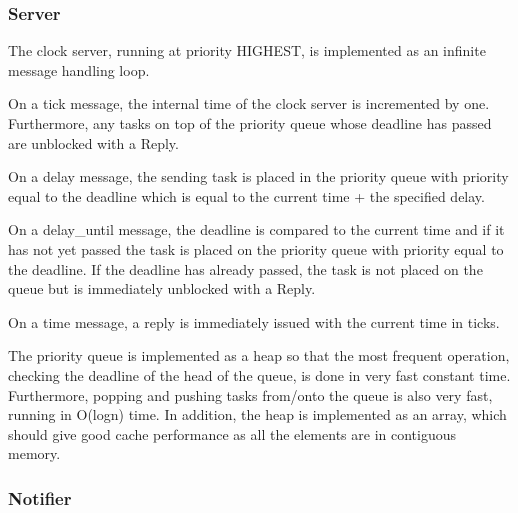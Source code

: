 \documentclass{article}
\begin{document}
\subsubsection{Server}
The clock server, running at priority HIGHEST, is implemented as an infinite message handling loop. 

On a tick message, the internal time of the clock server is incremented by one. Furthermore, any tasks on top of the priority queue whose deadline has passed are unblocked with a Reply.

On a delay message, the sending task is placed in the priority queue with priority equal to the deadline which is equal to the current time + the specified delay.

On a delay_until message, the deadline is compared to the current time and if it has not yet passed the task is placed on the priority queue with priority equal to the deadline. If the deadline has already passed, the task is not placed on the queue but is immediately unblocked with a Reply.

On a time message, a reply is immediately issued with the current time in ticks.

The priority queue is implemented as a heap so that the most frequent operation, checking the deadline of the head of the queue, is done in very fast constant time. Furthermore, popping and pushing tasks from/onto the queue is also very fast, running in O(logn) time. In addition, the heap is implemented as an array, which should give good cache performance as all the elements are in contiguous memory.

\subsubsection{Notifier}
\end{document}

